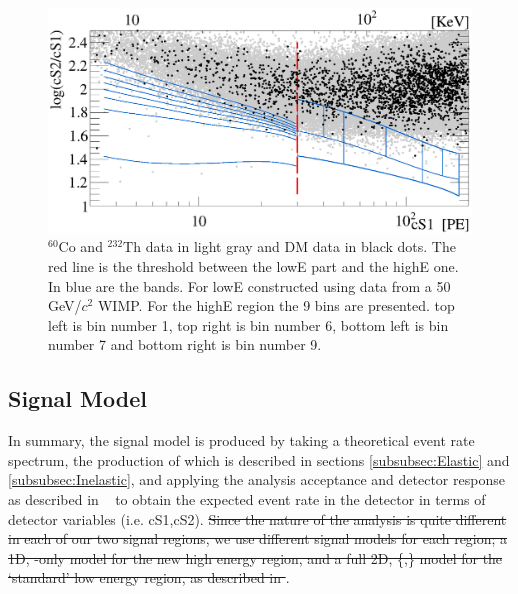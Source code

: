 \begin{figure}[t!]
\begin{minipage}{1\linewidth}
\centerline{\includegraphics[width=1\linewidth]{Figures/eft_sr.eps}}
\end{minipage}
\caption{$^{60}\mathrm{Co}$ and $^{232}\mathrm{Th}$ data in light gray and DM data in black dots. The red line is the threshold between the lowE part and the highE one. In blue are the bands. For lowE constructed using data from a 50 GeV/$c^2$ WIMP. For the highE region the 9 bins are presented. top left is bin number 1,  top right is bin number 6, bottom left is bin number 7 and bottom right is bin number 9.}
\label{fig:phasespace}
\end{figure}  




\subsection{Signal Model}
\label{subsec:SignalModel}
In summary, the signal model is produced by taking a theoretical event rate spectrum, the production of which is described in sections \ref{subsubsec:Elastic} and \ref{subsubsec:Inelastic}, and applying the analysis acceptance and detector response as described in ~\cite{xe100_ana2012}  to obtain the expected event rate in the detector in terms of detector variables (i.e. cS1,cS2). \sout{Since the nature of the analysis is quite different in each of our two signal regions, we use different signal models for each region; a 1D, \cSi-only model for the new high energy region, and a full 2D, \{\cSi,\cSiib\} model for the `standard' low energy region, as described in \cite{xe100_run_combination}} . 


